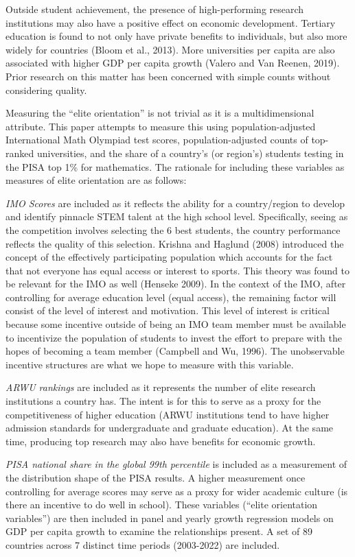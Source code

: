 \documentclass[11pt]{article}
\begin{document}
Outside student achievement, the presence of high-performing research institutions may also have a positive effect on economic development. Tertiary education is found to not only have private benefits to individuals, but also more widely for countries (Bloom et al., 2013). More universities per capita are also associated with higher GDP per capita growth (Valero and Van Reenen, 2019). Prior research on this matter has been concerned with simple counts without considering quality.

Measuring the “elite orientation” is not trivial as it is a multidimensional attribute. This paper attempts to measure this using population-adjusted International Math Olympiad test scores, population-adjusted counts of top-ranked universities, and the share of a country’s (or region’s) students testing in the PISA top 1\% for mathematics. The rationale for including these variables as measures of elite orientation are as follows:

\textit{IMO Scores} are included as it reflects the ability for a country/region to develop and identify pinnacle STEM talent at the high school level. Specifically, seeing as the competition involves selecting the 6 best students, the country performance reflects the quality of this selection. Krishna and Haglund (2008) introduced the concept of the effectively participating population which accounts for the fact that not everyone has equal access or interest to sports. This theory was found to be relevant for the IMO as well (Henseke 2009).  In the context of the IMO, after controlling for average education level (equal access), the remaining factor will consist of the level of interest and motivation. This level of interest is critical because some incentive outside of being an IMO team member must be available to incentivize the population of students to invest the effort to prepare with the hopes of becoming a team member (Campbell and Wu, 1996). The unobservable incentive structures are what we hope to measure with this variable.

\textit{ARWU rankings} are included as it represents the number of elite research institutions a country has. The intent is for this to serve as a proxy for the competitiveness of higher education (ARWU institutions tend to have higher admission standards for undergraduate and graduate education). At the same time, producing top research may also have benefits for economic growth.

\textit{PISA national share in the global 99th percentile} is included as a measurement of the distribution shape of the PISA results. A higher measurement once controlling for average scores may serve as a proxy for wider academic culture (is there an incentive to do well in school).
These variables (“elite orientation variables”) are then included in panel and yearly growth regression models on GDP per capita growth to examine the relationships present. A set of 89 countries across 7 distinct time periods (2003-2022) are included.
\end{document}
